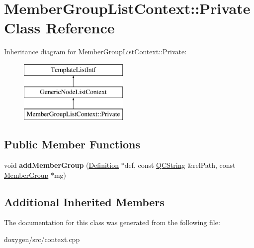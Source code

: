 \hypertarget{class_member_group_list_context_1_1_private}{}\section{Member\+Group\+List\+Context\+::Private Class Reference}
\label{class_member_group_list_context_1_1_private}
Inheritance diagram for Member\+Group\+List\+Context\+::Private\+:\begin{figure}[H]
\begin{center}
\leavevmode
\includegraphics[height=3.000000cm]{class_member_group_list_context_1_1_private}
\end{center}
\end{figure}
\subsection*{Public Member Functions}
\begin{DoxyCompactItemize}
\item 
\mbox{\label{class_member_group_list_context_1_1_private_a183edbb58c93c28dd258fe59ad16c88e}} 
void {\bfseries add\+Member\+Group} (\mbox{\hyperlink{class_definition}{Definition}} $\ast$def, const \mbox{\hyperlink{class_q_c_string}{Q\+C\+String}} \&rel\+Path, const \mbox{\hyperlink{class_member_group}{Member\+Group}} $\ast$mg)
\end{DoxyCompactItemize}
\subsection*{Additional Inherited Members}


The documentation for this class was generated from the following file\+:\begin{DoxyCompactItemize}
\item 
doxygen/src/context.\+cpp\end{DoxyCompactItemize}
